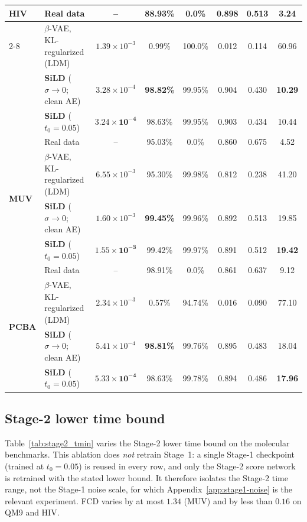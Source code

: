 \begin{table}[h]
{\begin{tabular}{llcccccc}
\midrule
\multirow{4}{*}{\textbf{HIV}}
 & Real data                               & --                      & 88.93\% & 0.0\%   & 0.898 & 0.513 & 3.24 \\
\cmidrule{2-8}
 & $\beta$-VAE, KL-regularized (LDM)       & $1.39\!\times\!10^{-3}$ & 0.99\%  & 100.0\% & 0.012 & 0.114 & 60.96 \\
 & \textbf{SiLD} ($\sigma\!\to\!0$; clean AE) & $3.28\!\times\!10^{-4}$ & \textbf{98.82\%} & 99.95\% & 0.904 & 0.430 & \textbf{10.29} \\
 & \textbf{SiLD} ($t_0=0.05$)              & $\mathbf{3.24\!\times\!10^{-4}}$ & 98.63\% & 99.95\% & 0.903 & 0.434 & 10.44 \\
\midrule
\multirow{4}{*}{\textbf{MUV}}
 & Real data                               & --                      & 95.03\% & 0.0\%   & 0.860 & 0.675 & 4.52 \\
\cmidrule{2-8}
 & $\beta$-VAE, KL-regularized (LDM)       & $6.55\!\times\!10^{-3}$ & 95.30\% & 99.98\% & 0.812 & 0.238 & 41.20 \\
 & \textbf{SiLD} ($\sigma\!\to\!0$; clean AE) & $1.60\!\times\!10^{-3}$ & \textbf{99.45\%} & 99.96\% & 0.892 & 0.513 & 19.85 \\
 & \textbf{SiLD} ($t_0=0.05$)              & $\mathbf{1.55\!\times\!10^{-3}}$ & 99.42\% & 99.97\% & 0.891 & 0.512 & \textbf{19.42} \\
\midrule
\multirow{4}{*}{\textbf{PCBA}}
 & Real data                               & --                      & 98.91\% & 0.0\%   & 0.861 & 0.637 & 9.12 \\
\cmidrule{2-8}
 & $\beta$-VAE, KL-regularized (LDM)       & $2.34\!\times\!10^{-3}$ & 0.57\%  & 94.74\% & 0.016 & 0.090 & 77.10 \\
 & \textbf{SiLD} ($\sigma\!\to\!0$; clean AE) & $5.41\!\times\!10^{-4}$ & \textbf{98.81\%} & 99.76\% & 0.895 & 0.483 & 18.04 \\
 & \textbf{SiLD} ($t_0=0.05$)              & $\mathbf{5.33\!\times\!10^{-4}}$ & 98.63\% & 99.78\% & 0.894 & 0.486 & \textbf{17.96} \\
\bottomrule
\end{tabular}%
}
\end{table}

\subsection{Stage-2 lower time bound}
\label{app:stage2-tmin}

Table~\ref{tab:stage2_tmin} varies the Stage-2 lower time bound on the
molecular benchmarks. This ablation does \emph{not} retrain Stage~1: a single
Stage-1 checkpoint (trained at $t_0=0.05$) is reused in every row, and only
the Stage-2 score network is retrained with the stated lower bound. It
therefore isolates the Stage-2 time range, not the Stage-1 noise scale, for
which Appendix~\ref{app:stage1-noise} is the relevant experiment. FCD varies
by at most $1.34$ (MUV) and by less than $0.16$ on QM9 and HIV.

